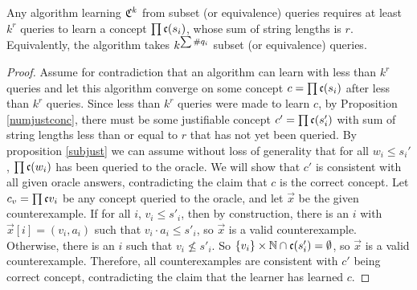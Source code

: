 \begin{theorem}
Any algorithm learning $\mathfrak{C}^k$ from subset (or equivalence) queries requires at least $k^r$ queries to learn a concept $\prod \mathfrak{c}(s_i)$, whose sum of string lengths is $r$.
Equivalently, the algorithm takes $k^{\sum \#q_{i}}$ subset (or equivalence) queries.
\end{theorem}
\begin{proof}
Assume for contradiction that an algorithm can learn with less than $k^r$ queries and let this algorithm converge on some concept $c = \prod \mathfrak{c}(s_i)$ after less than $k^r$ queries. 
Since less than $k^r$ queries were made to learn $c$, by Proposition \ref{numjustconc}, there must be some justifiable concept $c' = \prod \mathfrak{c}(s'_i)$ with sum of string lengths less than or equal to $r$ that has not yet been queried.
By proposition \ref{subjust} we can assume without loss of generality that for all $w_i \le s_i'$, $\prod \mathfrak{c}(w_i)$ has been queried to the oracle.
We will show that $c'$ is consistent with all given oracle answers, contradicting the claim that $c$ is the correct concept. 
Let $c_v = \prod \mathfrak{c}{v_i}$ be any concept queried to the oracle, and let $\vec{x}$ be the given counterexample.
If for all $i$, $v_i \le s'_i$, then by construction, there is an $i$ with $\vec{x}[i] = (v_i, a_i)$ such that $v_i \cdot a_i \le s'_i$, so $\vec{x}$ is a valid counterexample.
Otherwise, there is an $i$ such that $v_i \not\le s'_i$. 
So $\{v_i\} \times \mathbb{N}  \cap \mathfrak{c}(s'_i) = \emptyset$, so $\vec{x}$ is a valid counterexample. 
Therefore, all counterexamples are consistent with $c'$ being correct concept, contradicting the claim that the learner has learned $c$. 
\end{proof}







